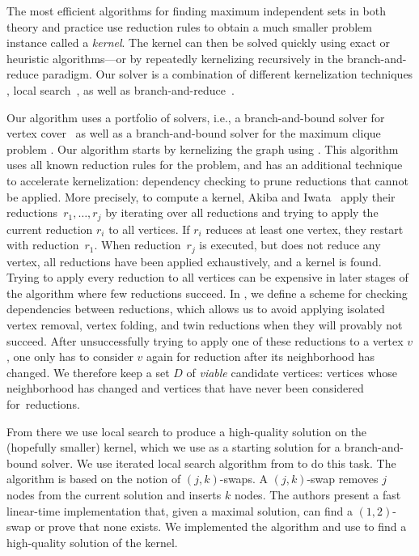 \documentclass[a4paper,UKenglish]{lipics-v2016}
\begin{document}
The most efficient algorithms for finding maximum independent sets in both theory and practice use reduction rules to obtain a much smaller problem instance called a \emph{kernel}. The kernel can then be solved quickly using exact or heuristic algorithms---or by repeatedly kernelizing recursively in the branch-and-reduce paradigm. 
Our solver is a combination of different kernelization techniques \cite{DBLP:conf/alenex/Hespe0S18}, local search~\cite{DBLP:conf/wea/AndradeRW08}, as well as branch-and-reduce~\cite{akiba-tcs-2016,DBLP:journals/cor/LiJM17}.

%
Our algorithm uses a portfolio of solvers, i.e., a branch-and-bound solver for vertex cover~\cite{akiba-tcs-2016} as well as a branch-and-bound solver for the maximum clique problem \cite{DBLP:journals/cor/LiJM17}.
Our algorithm starts by kernelizing the graph using \cite{DBLP:conf/alenex/Hespe0S18}. 
This algorithm uses all known reduction rules for the problem,
and has an additional technique to accelerate kernelization: dependency checking to prune reductions that cannot be applied.
More precisely, to compute a kernel, Akiba and Iwata~\cite{akiba-tcs-2016} apply their
reductions~$r_1, \dots ,r_j$ by iterating over all reductions and trying to
apply the current reduction $r_i$ to all vertices. If $r_i$ reduces at
least one vertex, they restart with reduction~$r_1$. When reduction~$r_j$ 
is executed, but does not reduce any vertex, all reductions have been applied
exhaustively, and a kernel is found. Trying to apply every reduction to all
vertices can be expensive in later stages of the algorithm where 
few reductions succeed. 
In \cite{DBLP:conf/alenex/Hespe0S18}, we define a scheme for checking dependencies between reductions, which allows us to
avoid applying isolated vertex removal, vertex folding, and twin reductions when they
will provably not succeed. After unsuccessfully trying to apply one
of these reductions to a vertex $v$, one only has to consider $v$ again for reduction
after its neighborhood has changed. We therefore keep a
set $D$ of \emph{viable} candidate vertices: vertices whose neighborhood has changed
and vertices that have never been considered for~reductions.

From there we use local search to produce a high-quality solution on the (hopefully smaller) kernel, which we use as a starting solution for a branch-and-bound solver. We use iterated local search algorithm from \cite{DBLP:conf/wea/AndradeRW08} to do this task.
The algorithm is based on  the notion of $(j,k)$-swaps. A $(j,k)$-swap removes $j$ nodes from the current solution and inserts $k$ nodes. The authors present a fast linear-time implementation that, given a maximal solution, can find a $(1,2)$-swap or prove that none exists. We implemented the algorithm and use to find a high-quality solution of the kernel. 
\end{document}
